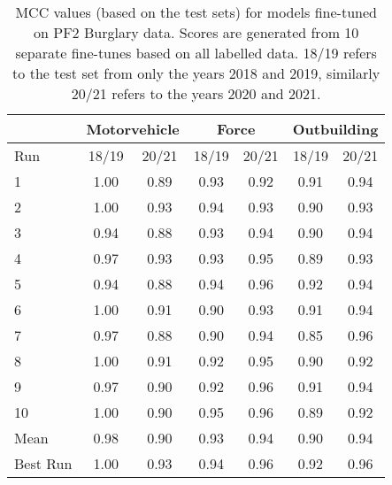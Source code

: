 \begin{table}[]
\centering
\begin{tabular}{@{}lcccccc@{}}
\toprule
         & \multicolumn{2}{c}{Motorvehicle} & \multicolumn{2}{c}{Force} & \multicolumn{2}{c}{Outbuilding} \\ \midrule
Run      & 18/19           & 20/21          & 18/19       & 20/21       & 18/19          & 20/21          \\
1        & 1.00            & 0.89           & 0.93        & 0.92        & 0.91           & 0.94           \\
2        & 1.00            & 0.93           & 0.94        & 0.93        & 0.90           & 0.93           \\
3        & 0.94            & 0.88           & 0.93        & 0.94        & 0.90           & 0.94           \\
4        & 0.97            & 0.93           & 0.93        & 0.95        & 0.89           & 0.93           \\
5        & 0.94            & 0.88           & 0.94        & 0.96        & 0.92           & 0.94           \\
6        & 1.00            & 0.91           & 0.90        & 0.93        & 0.91           & 0.94           \\
7        & 0.97            & 0.88           & 0.90        & 0.94        & 0.85           & 0.96           \\
8        & 1.00            & 0.91           & 0.92        & 0.95        & 0.90           & 0.92           \\
9        & 0.97            & 0.90           & 0.92        & 0.96        & 0.91           & 0.94           \\
10       & 1.00            & 0.90           & 0.95        & 0.96        & 0.89           & 0.92           \\\midrule
Mean     & 0.98            & 0.90           & 0.93        & 0.94        & 0.90           & 0.94           \\\midrule
Best Run & 1.00            & 0.93           & 0.94        & 0.96        & 0.92           & 0.96           \\ \bottomrule
\end{tabular}
\caption[Final model MCC metrics. PF2 data. All models.]{\label{tab:lancs_mcc}MCC values (based on the test sets) for models fine-tuned on PF2 Burglary data. Scores are generated from 10 separate fine-tunes based on all labelled data. 18/19 refers to the test set from only the years 2018 and 2019, similarly 20/21 refers to the years 2020 and 2021.}
\end{table}




